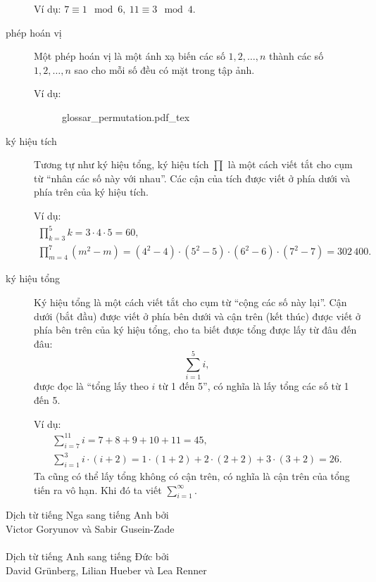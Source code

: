 \begin{description}
		Ví dụ: $7\equiv 1 \mod 6,\ 11\equiv 3\mod 4$. 

	\item[phép hoán vị] Một phép hoán vị là một ánh xạ biến các số $1,2,\dotsc,n$ thành các số $1,2,\dotsc,n$ sao cho mỗi số đều có mặt trong tập ảnh. 

		Ví dụ:
		\begin{figure} 
			\def\svgwidth{200pt} 
			{glossar_permutation.pdf_tex} 
		\end{figure} 
	
	\item[ký hiệu tích] Tương tự như ký hiệu tổng, ký hiệu tích $\prod$ là một cách viết tắt cho cụm từ \enquote{nhân các số này với nhau}. Các cận của tích được viết ở phía dưới và phía trên của ký hiệu tích.

		Ví dụ: 
		\begin{gather*}
			\prod\limits_{k=3}^5 k = 3\cdot 4\cdot 5 = 60,\\
			\prod\limits_{m=4}^7 (m^2 - m) = (4^2-4)\cdot(5^2-5)\cdot (6^2-6) \cdot (7^2-7)= 302\,400.
		\end{gather*}
	\item[ký hiệu tổng] Ký hiệu tổng là một cách viết tắt cho cụm từ \enquote{cộng các số này lại}. Cận dưới (bắt đầu) được viết ở phía bên dưới và cận trên (kết thúc) được viết ở phía bên trên của ký hiệu tổng, cho ta biết được tổng được lấy từ đâu đến đâu:		
		\begin{equation*}
			\sum\limits_{i=1}^5 i,
		\end{equation*}
		được đọc là \enquote{tổng lấy theo $i$ từ 1 đến 5}, có nghĩa là lấy tổng các số từ 1 đến 5. 

		Ví dụ:
		\begin{gather*}
			\sum\limits_{i=7}^{11} i= 7+8+9+10+11 = 45,\\
			\sum\limits_{i=1}^3 i\cdot (i+2) = 1\cdot (1+2) + 2\cdot (2+2) + 3\cdot (3+2) = 26.
		\end{gather*}
		Ta cũng có thể lấy tổng không có cận trên, có nghĩa là cận trên của tổng tiến ra vô hạn. Khi đó ta viết $\sum\limits_{i=1}^\infty$. 
\end{description}
\clearpage
\null\vfill
\noindent
Dịch từ tiếng Nga sang tiếng Anh bởi \\
\null\quad Victor Goryunov và Sabir Gusein-Zade\\
\\
Dịch từ tiếng Anh sang tiếng Đức bởi \\
\null\quad David Grünberg, Lilian Hueber và Lea Renner\\
